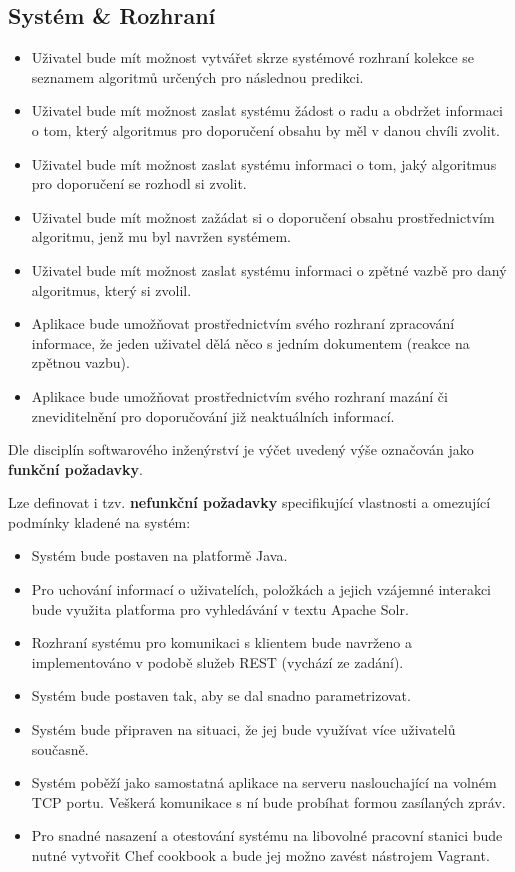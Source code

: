 \documentclass[thesis=M,czech]{FITthesis}[2014/05/07]
\begin{document}
\subsection{Systém \& Rozhraní}

\begin{itemize}
	\item Uživatel bude mít možnost vytvářet skrze systémové rozhraní kolekce se seznamem algoritmů určených pro následnou predikci.
	\item Uživatel bude mít možnost zaslat systému žádost o radu a obdržet informaci o tom, který algoritmus pro doporučení obsahu by měl v danou chvíli zvolit.
	\item Uživatel bude mít možnost zaslat systému informaci o tom, jaký algoritmus pro doporučení se rozhodl si zvolit.
	\item Uživatel bude mít možnost zažádat si o doporučení obsahu prostřednictvím algoritmu, jenž mu byl navržen systémem.
	\item Uživatel bude mít možnost zaslat systému informaci o zpětné vazbě pro daný algoritmus, který si zvolil.
	\item Aplikace bude umožňovat prostřednictvím svého rozhraní zpracování informace, že jeden uživatel dělá něco s jedním dokumentem (reakce na zpětnou vazbu).
	\item Aplikace bude umožňovat prostřednictvím svého rozhraní mazání či zneviditelnění pro doporučování již neaktuálních informací.
\end{itemize}

Dle disciplín softwarového inženýrství je výčet uvedený výše označován jako \textbf{funkční požadavky}.

Lze definovat i tzv. \textbf{nefunkční požadavky} specifikující vlastnosti a omezující podmínky kladené na systém:

\begin{itemize}
	\item Systém bude postaven na platformě Java.
	\item Pro uchování informací o uživatelích, položkách a jejich vzájemné interakci bude využita platforma pro vyhledávání v textu Apache Solr.
	\item Rozhraní systému pro komunikaci s klientem bude navrženo a implementováno v podobě služeb REST (vychází ze zadání).
	\item Systém bude postaven tak, aby se dal snadno parametrizovat. 
	\item Systém bude připraven na situaci, že jej bude využívat více uživatelů současně.
	\item Systém poběží jako samostatná aplikace na serveru naslouchající na volném TCP portu. Veškerá komunikace s ní bude probíhat formou zasílaných zpráv.
	\item Pro snadné nasazení a otestování systému na libovolné pracovní stanici bude nutné vytvořit Chef cookbook a bude jej možno zavést nástrojem Vagrant.
\end{itemize}
\end{document}
